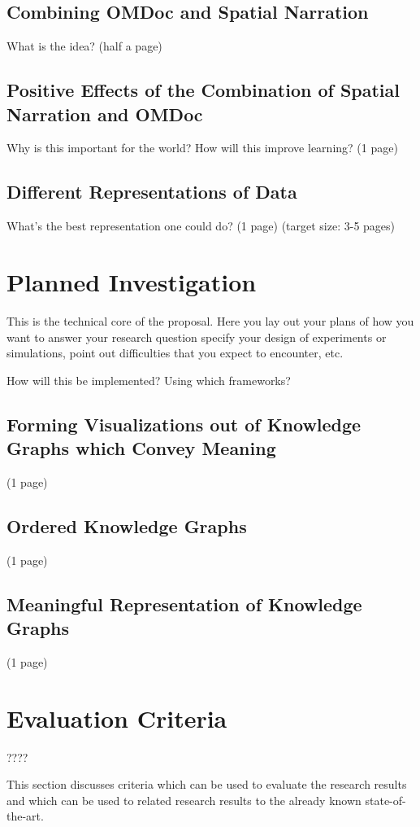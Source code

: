 \documentclass[twoside]{article}
\begin{document}
\subsection{Combining OMDoc and Spatial Narration}
What is the idea?
(half a page)
\newpage
\subsection{Positive Effects of the Combination of Spatial Narration and OMDoc}
Why is this important for the world?
How will this improve learning?
(1 page)
\newpage
\subsection{Different Representations of Data}
What's the best representation one could do?
(1 page)
  (target size: 3-5 pages)
\newpage
\section{Planned Investigation}

  This is the technical core of the proposal. Here you lay out your
  plans of how you want to answer your research question specify your
  design of experiments or simulations, point out difficulties that
  you expect to encounter, etc.

How will this be implemented?
Using which frameworks?
  

\subsection{Forming Visualizations out of Knowledge Graphs which Convey Meaning}
(1 page)
\newpage

\subsection{Ordered Knowledge Graphs}
(1 page)
\newpage

\subsection{Meaningful Representation of Knowledge Graphs}
(1 page)
\newpage


\section{Evaluation Criteria}

????

  This section discusses criteria which can be used to evaluate the
  research results and which can be used to related research results
  to the already known state-of-the-art.
\end{document}
